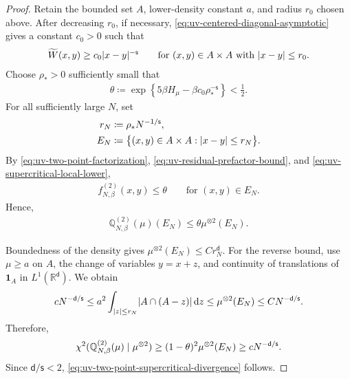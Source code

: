 \documentclass[11pt,reqno]{amsart}
\numberwithin{equation}{section}
\theoremstyle{plain}
\theoremstyle{remark}
\DeclarePairedDelimiter{\pa}{\lparen}{\rparen}
\DeclarePairedDelimiter{\abs}{\lvert}{\rvert}
\renewcommand{\d}{\mathsf{d}}
\newcommand{\md}{\mathrm{d}}
\newcommand{\R}{{\mathbb{R}}}
\newcommand{\Q}{{\mathbb{Q}}}
\newcommand{\tl}{\widetilde}
\newcommand{\be}{\beta}
\newcommand{\s}{\mathsf{s}}
\newcommand{\Chi}{\chi^2}
\newcommand{\one}{\mathbf 1}
\begin{document}
\begin{proof}
Retain the bounded set \(A\), lower-density constant \(a\), and radius \(r_0\) chosen above.  After decreasing \(r_0\), if necessary, \eqref{eq:uv-centered-diagonal-asymptotic} gives a constant \(c_0>0\) such that
\begin{align}\label{eq:uv-supercritical-local-lower}
 \tl W(x,y)\ge c_0\abs{x-y}^{-\s}
 \qquad\text{for \((x,y)\in A\times A\) with \(\abs{x-y}\le r_0\)}.
\end{align}
Choose \(\rho_*>0\) sufficiently small that
\begin{align}\label{eq:uv-close-pair-theta}
 \theta
 \coloneqq \exp\left\{5\be H_\mu-\be c_0\rho_*^{-\s}\right\}
 <\frac12.
\end{align}
For all sufficiently large \(N\), set
\begin{align}
 r_N&\coloneqq\rho_*N^{-1/\s},
 \label{eq:uv-close-pair-radius}\\
 E_N&\coloneqq
 \bigl\{(x,y)\in A\times A:\abs{x-y}\le r_N\bigr\}.
 \label{eq:uv-close-pair-set}
\end{align}
By \eqref{eq:uv-two-point-factorization}, \eqref{eq:uv-residual-prefactor-bound}, and \eqref{eq:uv-supercritical-local-lower},
\begin{align}\label{eq:uv-close-pair-pointwise-depletion}
 f_{N,\be}^{(2)}(x,y)\le\theta
 \qquad\text{for \((x,y)\in E_N\)}.
\end{align}
Hence,
\begin{align}\label{eq:uv-close-pair-gibbs-depletion}
 \Q_{N,\be}^{(2)}(\mu)(E_N)
 \le\theta\mu^{\otimes2}(E_N).
\end{align}

Boundedness of the density gives \(\mu^{\otimes2}(E_N)\le Cr_N^\d\).  For the reverse bound, use \(\mu\ge a\) on \(A\), the change of variables \(y=x+z\), and continuity of translations of \(\one_A\) in \(L^1(\R^\d)\).  We obtain
\begin{align}\label{eq:uv-close-pair-probability-scale}
 cN^{-\d/\s}
 \le a^2\int_{\abs z\le r_N}\abs{A\cap(A-z)}\,\md z
 \le \mu^{\otimes2}(E_N)
 \le CN^{-\d/\s}.
\end{align}
Therefore,
\begin{align}\label{eq:uv-supercritical-chi-lower-from-event}
 \Chi\pa{\Q_{N,\be}^{(2)}(\mu)\mid\mu^{\otimes2}}
 \ge(1-\theta)^2\mu^{\otimes2}(E_N)
 \ge cN^{-\d/\s}.
\end{align}
Since \(\d/\s<2\), \eqref{eq:uv-two-point-supercritical-divergence} follows.
\end{proof}
\end{document}
